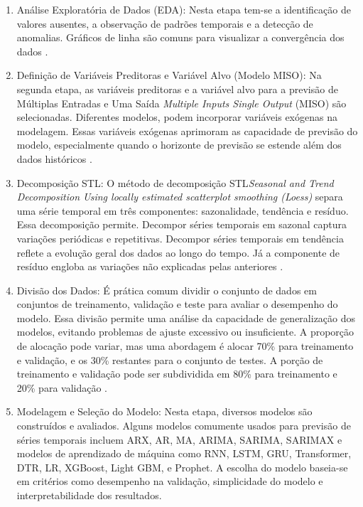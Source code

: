 \begin{enumerate}

\item {Análise Exploratória de Dados (EDA)}: Nesta etapa  tem-se a identificação de valores ausentes, a observação de padrões temporais e a detecção de anomalias. Gráficos de linha são comuns para visualizar a convergência dos dados \cite{Rostam2021108249}.
	
\item {Definição de Variáveis Preditoras e Variável Alvo (Modelo MISO)}: Na segunda etapa, as variáveis preditoras e a variável alvo para a previsão de Múltiplas Entradas e Uma Saída \textit{ Multiple Inputs Single Output} (MISO) são selecionadas. Diferentes modelos, podem incorporar variáveis exógenas na modelagem. Essas variáveis exógenas aprimoram as capacidade de previsão do modelo, especialmente quando o horizonte de previsão se estende além dos dados históricos \cite{PAWLOWSKI202298}. 
	
\item {Decomposição STL}: O método de decomposição STL\textit{Seasonal and Trend Decomposition Using locally estimated scatterplot smoothing (Loess)} separa uma série temporal em três componentes: sazonalidade, tendência e resíduo. Essa decomposição permite. Decompor séries temporais em sazonal captura variações periódicas e repetitivas. Decompor séries temporais em tendência reflete a evolução geral dos dados ao longo do tempo. Já a componente de resíduo engloba as variações não explicadas pelas anteriores \cite{Bandara2021}.
	
\item {Divisão dos Dados}: É prática comum dividir o conjunto de dados em conjuntos de treinamento, validação e teste para avaliar o desempenho do modelo. Essa divisão permite uma análise da capacidade de generalização dos modelos, evitando problemas de ajuste excessivo ou insuficiente. A proporção de alocação pode variar, mas uma abordagem é alocar 70\% para treinamento e validação, e os 30\% restantes para o conjunto de testes. A porção de treinamento e validação pode ser subdividida em 80\% para treinamento e 20\% para validação \cite{Tao2020}.
	
\item {Modelagem e Seleção do Modelo}: Nesta etapa, diversos modelos são construídos e avaliados. Alguns modelos comumente usados para previsão de séries temporais incluem ARX, AR, MA, ARIMA, SARIMA, SARIMAX  e modelos de aprendizado de máquina como RNN, LSTM, GRU, Transformer, DTR, LR, XGBoost, Light GBM, e Prophet. A escolha do modelo baseia-se em critérios como desempenho na validação, simplicidade do modelo e interpretabilidade dos resultados.
	

\end{enumerate}
